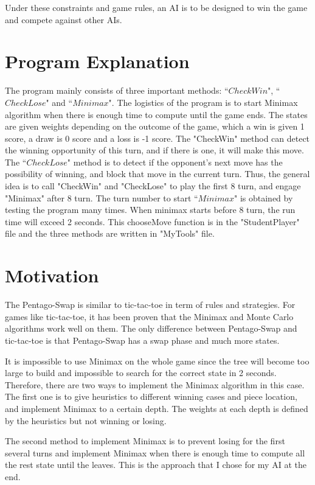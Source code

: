 \documentclass[a4paper,titlepage]{article}
\begin{document}
Under these constraints and game rules, an AI is to be designed to win the game and compete against other AIs.

\section{Program Explanation}

The program mainly consists of three important methods: ``$CheckWin$", ``$CheckLose$" and ``$Minimax$". The logistics of the program is to start Minimax algorithm when there is enough time to compute until the game ends. The states are given weights depending on the outcome of the game, which a win is given 1 score, a draw is 0 score and a loss is -1 score. The "CheckWin" method can detect the winning opportunity of this turn, and if there is one, it will make this move. The ``$CheckLose$" method is to detect if the opponent's next move has the possibility of winning, and block that move in the current turn. Thus, the general idea is to call "CheckWin" and "CheckLose" to play the first 8 turn, and engage "Minimax" after 8 turn. The turn number to start ``$Minimax$" is obtained by testing the program many times. When minimax starts before 8 turn, the run time will exceed 2 seconds. This chooseMove function is in the "StudentPlayer" file and the three methods are written in "MyTools" file.

\section{Motivation}
The Pentago-Swap is similar to tic-tac-toe in term of rules and strategies. For games like tic-tac-toe, it has been proven that the Minimax and Monte Carlo algorithms work well on them. The only difference between Pentago-Swap and tic-tac-toe is that Pentago-Swap has a swap phase and much more states. 

It is impossible to use Minimax on the whole game since the tree will become too large to build and impossible to search for the correct state in 2 seconds. Therefore, there are two ways to implement the Minimax algorithm in this case. The first one is to give heuristics to different winning cases and piece location, and implement Minimax to a certain depth. The weights at each depth is defined by the heuristics but not winning or losing. 

The second method to implement Minimax is to prevent losing for the first several turns and implement Minimax when there is enough time to compute all the rest state until the leaves. This is the approach that I chose for my AI at the end. 
\end{document}
